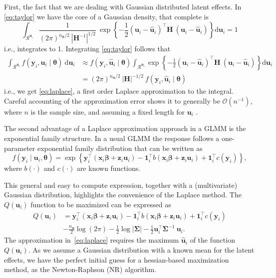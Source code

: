 First, the fact that we are dealing with Gaussian distributed latent
effects. In \autoref{eq:taylor} we have the core of a Gaussian density,
that complete is
\[
 \int_{\mathcal{R}^{\bm{u}_{i}}}
 \frac{1}{(2\pi)^{n_{\bm{u}}/2}~|\bm{H}^{-1}|^{1/2}}~\exp
 \left\{-\frac{1}{2} (\bm{u}_{i} - \bm{\hat{u}}_{i})^{\top}\bm{H}~
                     (\bm{u}_{i} - \bm{\hat{u}}_{i})
 \right\} \text{d} \bm{u}_{i} = 1
\]
i.e., integrates to 1. Integrating \autoref{eq:taylor} follows that
\begin{align*}
 \int_{\mathcal{R}^{\bm{u}_{i}}}
 f(\bm{y}_{i}, \bm{u}_{i} \mid \bm{\theta})~\text{d} \bm{u}_{i}
 &\approx f(\bm{y}_{i}, \bm{\hat{u}}_{i} \mid \bm{\theta})
  \int_{\mathcal{R}^{\bm{u}_{i}}}
  \exp \left\{-\frac{1}{2}
               (\bm{u}_{i} - \bm{\hat{u}}_{i})^{\top}\bm{H}~
               (\bm{u}_{i} - \bm{\hat{u}}_{i})
       \right\} \text{d} \bm{u}_{i}\\
 &= (2\pi)^{n_{\bm{u}}/2}~|\bm{H}|^{-1/2}~
    f(\bm{y}_{i}, \bm{\hat{u}}_{i} \mid \bm{\theta})
\end{align*}
i.e., we get \autoref{eq:laplace}, a first order Laplace approximation
to the integral. Careful accounting of the approximation error shows it
to generally be \(\mathcal{O}(n^{-1})\), where \(n\) is the sample size,
and assuming a fixed length for \(\bm{u}_{i}\) \cite{corestats}.

The second advantage of a Laplace approximation approach in a GLMM is
the exponential family structure. In a usual GLMM the response follows a
one-parameter exponential family distribution that can be written as
\[
 f(\bm{y}_{i} \mid \bm{u}_{i}, \bm{\theta}) =
 \exp \left\{
  \bm{y}_{i}^{\top} (\bm{x}_{i}\bm{\beta} + \bm{z}_{i}\bm{u}_{i}) -
  \bm{1}_{i}^{\top}b(\bm{x}_{i}\bm{\beta} + \bm{z}_{i}\bm{u}_{i}) +
  \bm{1}_{i}^{\top} c(\bm{y}_{i})
      \right\},
\]
where \(b(\cdot)\) and \(c(\cdot)\) are known functions.

This general and easy to compute expression, together with a
(multivariate) Gaussian distribution, highlights the convenience of the
Laplace method. The \(Q(\bm{u}_{i})\) function to be maximized can be
expressed as
\begin{equation}
 \begin{aligned}
  Q(\bm{u}_{i}) &=
  \bm{y}_{i}^{\top} (\bm{x}_{i}\bm{\beta} + \bm{z}_{i}\bm{u}_{i}) -
  \bm{1}_{i}^{\top}b(\bm{x}_{i}\bm{\beta} + \bm{z}_{i}\bm{u}_{i}) +
  \bm{1}_{i}^{\top} c(\bm{y}_{i})\\
  &- \frac{n_{\bm{u}}}{2} \log (2\pi) -
     \frac{1}{2} \log |\bm{\Sigma}| -
     \frac{1}{2} \bm{u}_{i}^{\top}\bm{\Sigma}^{-1}~\bm{u}_{i}.
 \end{aligned}
\end{equation}
The approximation in~\autoref{eq:laplace} requires the maximum
\(\bm{\hat{u}}_{i}\) of the function \(Q(\bm{u}_{i})\). As we assume a
Gaussian distribution with a known mean for the latent effects, we have
the perfect initial guess for a hessian-based maximization method, as
the Newton-Raphson (NR) algorithm.


